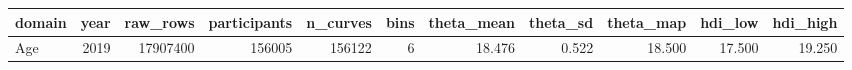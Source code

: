\begin{tabular}{lrrrrrrrrrr}
\toprule
domain & year & raw_rows & participants & n_curves & bins & theta_mean & theta_sd & theta_map & hdi_low & hdi_high \\
\midrule
Age & 2019 & 17907400 & 156005 & 156122 & 6 & 18.476 & 0.522 & 18.500 & 17.500 & 19.250 \\
\bottomrule
\end{tabular}

